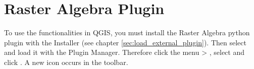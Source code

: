 
\section{Raster Algebra Plugin}\label{sec:raster_algebra}



To use the functionalities in QGIS, you must install the Raster Algebra 
python plugin with the  Installer 
(see chapter \ref{sec:load_external_plugin}). Then select and load it 
with the Plugin Manager. Therefore click the menu  > 
, select  and click 
. A new  icon occurs 
in the toolbar.

